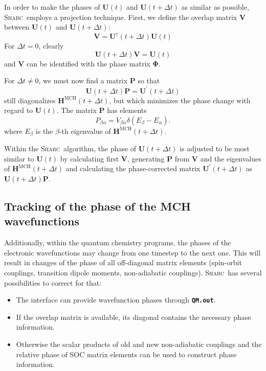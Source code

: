 \documentclass[a4paper,11pt,DIV=15,openany,twoside=false]{scrbook}
\newcommand{\sharc}{\textsc{Sharc}}
\newcommand{\ttt}[1]{\textbf{\texttt{#1}}}
\newcommand{\VEC}[1]{\ensuremath{\mathbf{#1}}}
\begin{document}
In order to make the phases of $\VEC{U}(t)$ and $\VEC{U}(t+\Delta t)$ as similar as possible, \sharc\ employs a projection technique. First, we define the overlap matrix $\VEC{V}$ between $\VEC{U}(t)$ and $\VEC{U}(t+\Delta t)$:
\begin{equation}
  \VEC{V}=\VEC{U}^\dagger(t+\Delta t)\VEC{U}(t)
\end{equation}
For $\Delta t=0$, clearly
\begin{equation}
  \VEC{U}(t+\Delta t)\VEC{V}=\VEC{U}(t)
\end{equation}
and $\VEC{V}$ can be identified with the phase matrix $\boldsymbol{\Phi}$.

For $\Delta t\neq 0$, we must now find a matrix $\VEC{P}$ so that
\begin{equation}
  \VEC{U}(t+\Delta t)\VEC{P}=\VEC{U}^\prime(t+\Delta t)
\end{equation}
still diagonalizes $\VEC{H}^{\text{MCH}}(t+\Delta t)$, but which minimizes the phase change with regard to $\VEC{U}(t)$.
The matrix $\VEC{P}$ has elements
\begin{equation}
  P_{\beta\alpha}=V_{\beta\alpha}
  \delta\left(
    E_\beta-E_\alpha
  \right).
\end{equation}
where $E_\beta$ is the $\beta$-th eigenvalue of $\VEC{H}^{\text{MCH}}(t+\Delta t)$.

Within the \sharc\ algorithm, the phase of $\VEC{U}(t+\Delta t)$ is adjusted to be most similar to $\VEC{U}(t)$ by calculating first $\VEC{V}$, generating $\VEC{P}$ from $\VEC{V}$ and the eigenvalues of $\VEC{H}^{\text{MCH}}(t+\Delta t)$ and calculating the phase-corrected matrix $\VEC{U}^\prime(t+\Delta t)$ as $\VEC{U}(t+\Delta t)\VEC{P}$.

\subsection{Tracking of the phase of the MCH wavefunctions}

Additionally, within the quantum chemistry programs, the phases of the electronic wavefunctions may change from one timestep to the next one. This will result in changes of the phase of all off-diagonal matrix elements (spin-orbit couplings, transition dipole moments, non-adiabatic couplings). \sharc\ has several possibilities to correct for that:
\begin{itemize}
  \item The interface can provide wavefunction phases through \ttt{QM.out}.
  \item If the overlap matrix is available, its diagonal contains the necessary phase information.
  \item Otherwise the scalar products of old and new non-adiabatic couplings and the relative phase of SOC matrix elements can be used to construct phase information.
\end{itemize}
\end{document}
